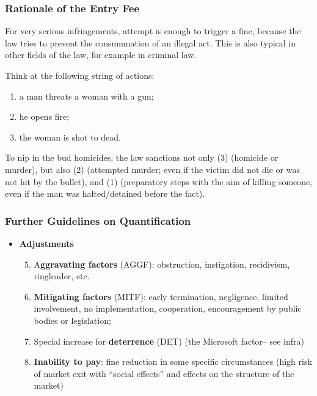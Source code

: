         \subsubsection{Rationale of the Entry Fee}

            For very serious infringements, attempt is enough to trigger a fine, because the law tries to prevent the consummation of an illegal act. This is also typical in other fields of the law, for example in criminal law.

            Think at the following string of actions:
                \begin{enumerate}
                    \item a man threats a woman with a gun;
                    \item he opens fire;
                    \item the woman is shot to dead.
                \end{enumerate}

            To nip in the bud homicides, the law sanctions not only (3) (homicide or murder), but also (2) (attempted murder; even if the victim did not die or was not hit by the bullet), and (1) (preparatory steps with the aim of killing someone, even if the man was halted/detained before the fact).

        \subsubsection{Further Guidelines on Quantification}

            \begin{itemize}
                \item \textbf{Adjustments}
                    \begin{enumerate}
                    \setcounter{enumi}{4}
                        \item A\textbf{ggravating factors} (AGGF): obstruction, instigation, recidivism, ringleader, etc.
                        \item \textbf{Mitigating factors} (MITF): early termination, negligence, limited involvement, no implementation, cooperation, encouragement by public bodies or legislation;
                        \item Special increase for \textbf{deterrence} (DET) (the Microsoft factor– see infra)
                        \item \textbf{Inability to pay}: fine reduction in some specific circumstances (high risk of market exit with “social effects” and effects on the structure of the market)
                    \end{enumerate}
            \end{itemize}

